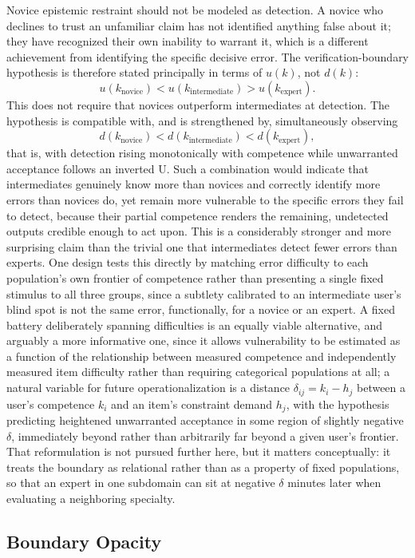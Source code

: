 \documentclass[11pt]{article}
\begin{document}
Novice epistemic restraint should not be modeled as detection. A novice who declines to trust an unfamiliar claim has not identified anything false about it; they have recognized their own inability to warrant it, which is a different achievement from identifying the specific decisive error. The verification-boundary hypothesis is therefore stated principally in terms of $u(k)$, not $d(k)$:
\[
u(k_{\mathrm{novice}}) < u(k_{\mathrm{intermediate}}) > u(k_{\mathrm{expert}}).
\]
This does not require that novices outperform intermediates at detection. The hypothesis is compatible with, and is strengthened by, simultaneously observing
\[
d(k_{\mathrm{novice}}) < d(k_{\mathrm{intermediate}}) < d(k_{\mathrm{expert}}),
\]
that is, with detection rising monotonically with competence while unwarranted acceptance follows an inverted U. Such a combination would indicate that intermediates genuinely know more than novices and correctly identify more errors than novices do, yet remain more vulnerable to the specific errors they fail to detect, because their partial competence renders the remaining, undetected outputs credible enough to act upon. This is a considerably stronger and more surprising claim than the trivial one that intermediates detect fewer errors than experts. One design tests this directly by matching error difficulty to each population's own frontier of competence rather than presenting a single fixed stimulus to all three groups, since a subtlety calibrated to an intermediate user's blind spot is not the same error, functionally, for a novice or an expert. A fixed battery deliberately spanning difficulties is an equally viable alternative, and arguably a more informative one, since it allows vulnerability to be estimated as a function of the relationship between measured competence and independently measured item difficulty rather than requiring categorical populations at all; a natural variable for future operationalization is a distance $\delta_{ij} = k_i - h_j$ between a user's competence $k_i$ and an item's constraint demand $h_j$, with the hypothesis predicting heightened unwarranted acceptance in some region of slightly negative $\delta$, immediately beyond rather than arbitrarily far beyond a given user's frontier. That reformulation is not pursued further here, but it matters conceptually: it treats the boundary as relational rather than as a property of fixed populations, so that an expert in one subdomain can sit at negative $\delta$ minutes later when evaluating a neighboring specialty.

\subsection{Boundary Opacity}
\end{document}
